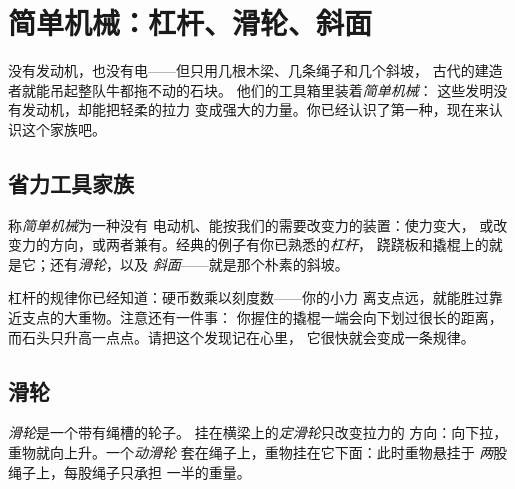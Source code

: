\chapter{简单机械：杠杆、滑轮、斜面}\label{ch:g5:simple-machines}

没有发动机，也没有电——但只用几根木梁、几条绳子和几个斜坡，
古代的建造者就能吊起整队牛都拖不动的石块。
他们的工具箱里装着\emph{简单机械}：
这些发明没有发动机，却能把轻柔的拉力
变成强大的力量。你已经认识了第一种，现在来认识这个家族吧。

\section{省力工具家族}

\begin{definition}[简单机械]\label{def:g5:simple-machines:machine}
称\emph{简单机械}为一种没有
电动机、能按我们的需要改变力的装置：使力变大，
或改变力的方向，或两者兼有。经典的例子有你已熟悉的\emph{杠杆}，
跷跷板和撬棍上的就是它；还有\emph{滑轮}，以及
\emph{斜面}——就是那个朴素的斜坡。
\end{definition}

\begin{example}[再看杠杆]\label{ex:g5:simple-machines:lever}
杠杆的规律你已经知道：硬币数乘以刻度数——你的小力
离支点远，就能胜过靠近支点的大重物。注意还有一件事：
你握住的撬棍一端会向下划过很长的距离，
而石头只升高一点点。请把这个发现记在心里，
它很快就会变成一条规律。
\end{example}

\section{滑轮}

\begin{definition}[滑轮]\label{def:g5:simple-machines:pulley}
\emph{滑轮}是一个带有绳槽的轮子。
挂在横梁上的\emph{定滑轮}只改变拉力的
方向：向下拉，重物就向上升。一个\emph{动滑轮}
套在绳子上，重物挂在它下面：此时重物悬挂于
\emph{两}股绳子上，每股绳子只承担
一半的重量。
\end{definition}

